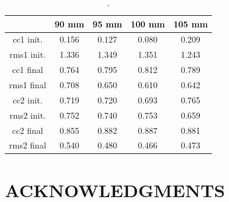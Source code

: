 \documentclass[manuscript,revised]{geophysics}
\begin{document}
\begin{table}[!ht]
	\centering
	\begin{tabular}{ccccc}
		\hline
		\qquad & 90 mm & 95 mm & 100 mm & 105 mm \\
		\hline
		cc1 init.  & 0.156 & 0.127 & 0.080 & 0.209 \\
		rms1 init. & 1.336 & 1.349 & 1.351 & 1.243 \\
		\hline
		cc1 final  & 0.764 & 0.795 & 0.812 & 0.789 \\
		rms1 final & 0.708 & 0.650 & 0.610 & 0.642 \\
		\hline
		\hline
		cc2 init.  & 0.719 & 0.720 & 0.693 & 0.765 \\
		rms2 init. & 0.752 & 0.740 & 0.753 & 0.659 \\
		\hline
		cc2 final  & 0.855 & 0.882 & 0.887 & 0.881 \\
		rms2 final & 0.540 & 0.480 & 0.466 & 0.473 \\
		\hline
	\end{tabular}
	\caption{.}
	\label{cc-rms}
\end{table}

\clearpage
\newpage 

\section{ACKNOWLEDGMENTS}

\clearpage
\newpage

%

\end{document}
